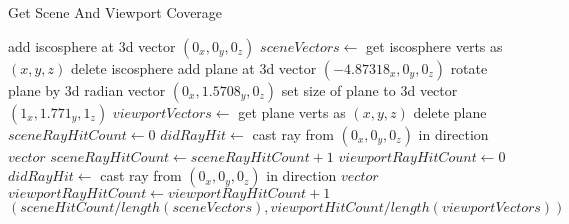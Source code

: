 ﻿\documentclass[a4paper]{article}
\begin{document}
    \begin{algorithm}
        \caption{Get Scene And Viewport Coverage}\label{alg:cap}
        \begin{algorithmic}[1]
            \State add iscosphere at 3d vector $(0_x,0_y,0_z)$
            \State $sceneVectors \gets$ get iscosphere verts as $(x,y,z)$
            \State delete iscosphere
            \State add plane at 3d vector $(-4.87318_x,0_y,0_z)$
            \State rotate plane by 3d radian vector $(0_x,1.5708_y,0_z)$
            \State set size of plane to 3d vector $(1_x,1.771_y,1_z)$
            \State $viewportVectors \gets$ get plane verts as $(x,y,z)$
            \State delete plane
            \State $sceneRayHitCount \gets 0$
                \State $didRayHit \gets$ cast ray from $(0_x,0_y,0_z)$ in direction $vector$
                    \State $sceneRayHitCount \gets sceneRayHitCount+1$
                \EndIf
            \EndFor
            \State $viewportRayHitCount \gets 0$
                \State $didRayHit \gets$ cast ray from $(0_x,0_y,0_z)$ in direction $vector$
                    \State $viewportRayHitCount \gets viewportRayHitCount+1$
                \EndIf
            \EndFor
            \State
            \Return $(sceneHitCount/length(sceneVectors),viewportHitCount/length(viewportVectors))$
        \end{algorithmic}
    \end{algorithm}
\end{document}
